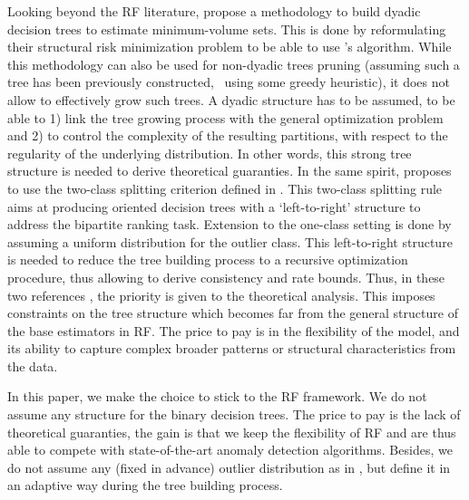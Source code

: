 Looking beyond the RF literature, \cite{Scott2006} propose a methodology to build dyadic decision trees to estimate minimum-volume sets. This is done by reformulating their structural risk minimization problem to be able to use \cite{Blanchard2004}'s algorithm. 
While this methodology can also be used for non-dyadic trees pruning (assuming such a tree has been previously constructed, \eg~using some greedy heuristic), it does not allow to effectively grow such trees. A dyadic structure has to be assumed, to be able to 1) link the tree growing process with the general optimization problem and 2) to control the complexity of the resulting partitions, with respect to the regularity of the underlying distribution. In other words, this strong tree structure is needed to derive theoretical guaranties.
In the same spirit, \cite{CLEM14} proposes to use the two-class splitting criterion defined in \cite{Clemencon2009Tree}. This two-class splitting rule aims at producing oriented decision trees with a `left-to-right' structure to address the bipartite ranking task. 
Extension to the one-class setting is done by assuming a uniform distribution for the outlier class. This left-to-right structure is needed to reduce the tree building process to a recursive optimization procedure, thus allowing to derive consistency and rate bounds. 
%
Thus, in these two references \citep{Scott2006, CLEM14}, the priority is given to the theoretical analysis. This imposes constraints on the tree structure which becomes far from the general structure of the base estimators in RF. The price to pay is in the flexibility of the model, and its ability to capture complex broader patterns or structural characteristics from the data.

In this paper, we make the choice to stick to the RF framework. We do not assume any structure for the binary decision trees. The price to pay is the lack of theoretical guaranties, the gain is that we keep the flexibility of RF and are thus able to compete with state-of-the-art anomaly detection algorithms.
Besides, we do not assume any (fixed in advance) outlier distribution as in \cite{CLEM14}, but define it in an adaptive way during the tree building process.


